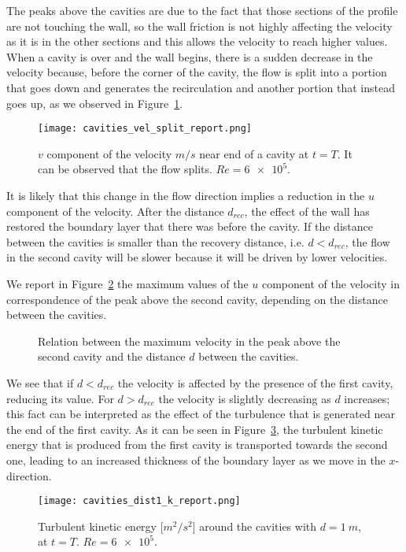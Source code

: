The peaks above the cavities are due to the fact that those sections of the 
profile are not touching the wall, so the wall friction is not highly affecting 
the velocity as it is in the other sections and this allows the velocity to 
reach higher values. When a cavity is over and the wall begins, there is a 
sudden 
decrease in the velocity because, before the corner of the cavity, the flow is 
split into a portion that goes down and generates the recirculation and another 
portion that instead goes up, as we observed in Figure~\ref{fig:vel_split}.
\begin{figure}
	\centering
	\texttt{[image: cavities\_vel\_split\_report.png]}
	\caption[$v$ component of the velocity near end of a cavity in the cavities 
	problem]{$v$ component of the velocity $\si{m/s}$ near end of a cavity at 
	$t=T$. It can be observed that the flow splits. $Re = \num{6e5}$.}
	\label{fig:vel_split}
\end{figure}
It is likely that this change in the flow direction implies a reduction in the 
$u$ component of the velocity. After the 
distance $d_{rec}$, the effect of the wall has restored the boundary layer that 
there was before the cavity. If the distance between the 
cavities is smaller than the recovery distance, i.e. $d < d_{rec}$, the flow in 
the second cavity will be slower because it will be driven by lower velocities.

We report in Figure~\ref{fig:velpeaks} the maximum values of the $u$ component 
of the velocity in correspondence of the peak above the second cavity, 
depending on the distance between the cavities.
\begin{figure}
	\centering
	
	\caption[Relation between the maximum velocity above the second cavity and 
	the distance between the cavities]{Relation between the maximum velocity in the peak above the second cavity and the distance $d$ between the cavities.}
	\label{fig:velpeaks}
\end{figure}
We see that if $d < d_{rec}$ the velocity is affected by the presence of 
the first cavity, reducing its value. For $d>d_{rec}$ the velocity is 
slightly decreasing as $d$ increases; this fact can be interpreted as the 
effect of the turbulence that 
is generated near the end of the first cavity. As it can be seen in 
Figure~\ref{fig:kd1}, the turbulent kinetic energy that is produced from the 
first cavity is transported towards the second one, leading to an increased 
thickness of the boundary layer as we move in the $x$-direction.
\begin{figure}
	\centering
	\texttt{[image: cavities\_dist1\_k\_report.png]}
	\caption[Turbulen kinetic energy in the cavities problem]{Turbulent kinetic energy [$\si{m^2/s^2}$] around the cavities with $d=\SI{1}{m}$, at $t=T$. $Re=\num{6e5}$.}
	\label{fig:kd1}
\end{figure}
%
